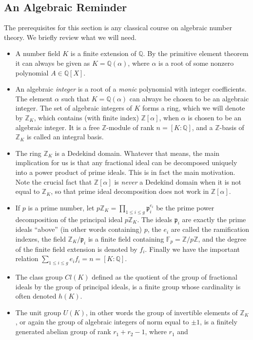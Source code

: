 \documentclass[12pt,a4paper]{article}
\newcommand{\Q}{{\mathbb Q}}
\newcommand{\Z}{{\mathbb Z}}
\newcommand{\F}{{\mathbb F}}
\newcommand{\al}{\alpha}
\newcommand{\p}{{\mathfrak p}}
\begin{document}
\subsection{An Algebraic Reminder}

The prerequisites for this section is any classical course on algebraic
number theory. We briefly review what we will need.

\begin{itemize}\item A number field $K$ is a finite extension of $\Q$. By the
primitive element theorem it can always be given as $K=\Q(\al)$, where
$\al$ is a root of some nonzero polynomial $A\in\Q[X]$.
\item An algebraic \emph{integer} is a root of a \emph{monic} polynomial
with integer coefficients. The element $\al$ such that $K=\Q(\al)$ can
always be chosen to be an algebraic integer. The set of algebraic integers
of $K$ forms a ring, which we will denote by $\Z_K$, which contains (with
finite index) $\Z[\al]$, when $\al$ is chosen to be an algebraic integer. It 
is a free $\Z$-module of rank $n=[K:\Q]$, and a $\Z$-basis of $\Z_K$ is
called an integral basis.
\item The ring $\Z_K$ is a Dedekind domain. Whatever that means, the main
implication for us is that any fractional ideal can be decomposed uniquely
into a power product of prime ideals. This is in fact the main motivation.
Note the crucial fact that $\Z[\al]$ is \emph{never} a Dedekind domain
when it is not equal to $\Z_K$, so that prime ideal decomposition does
not work in $\Z[\al]$.
\item If $p$ is a prime number, let $p\Z_K=\prod_{1\le i\le g}\p_i^{e_i}$
be the prime power decomposition of the principal ideal $p\Z_K$. The ideals
$\p_i$ are exactly the prime ideals ``above'' (in other words containing)
$p$, the $e_i$ are called the ramification indexes, the field $\Z_K/\p_i$
is a finite field containing $\F_p=\Z/p\Z$, and the degree of the finite
field extension is denoted by $f_i$. Finally we have the important relation
$\sum_{1\le i\le g}e_if_i=n=[K:\Q]$.
\item The class group $Cl(K)$ defined as the quotient of the group of
fractional ideals by the group of principal ideals, is a finite group whose
cardinality is often denoted $h(K)$.
\item The unit group $U(K)$, in other words the group of invertible elements
of $\Z_K$, or again the group of algebraic integers of norm equal to $\pm1$,
is a finitely generated abelian group of rank $r_1+r_2-1$, where $r_1$ and

\end{itemize}
\end{document}
